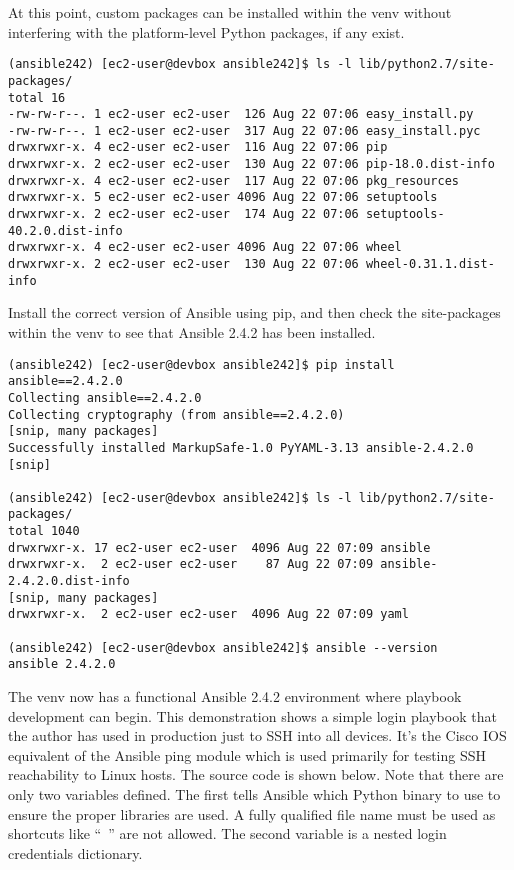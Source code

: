 At this point, custom packages can be installed within the venv without
interfering with the platform-level Python packages, if any exist.

\begin{verbatim}
(ansible242) [ec2-user@devbox ansible242]$ ls -l lib/python2.7/site-packages/
total 16
-rw-rw-r--. 1 ec2-user ec2-user  126 Aug 22 07:06 easy_install.py
-rw-rw-r--. 1 ec2-user ec2-user  317 Aug 22 07:06 easy_install.pyc
drwxrwxr-x. 4 ec2-user ec2-user  116 Aug 22 07:06 pip
drwxrwxr-x. 2 ec2-user ec2-user  130 Aug 22 07:06 pip-18.0.dist-info
drwxrwxr-x. 4 ec2-user ec2-user  117 Aug 22 07:06 pkg_resources
drwxrwxr-x. 5 ec2-user ec2-user 4096 Aug 22 07:06 setuptools
drwxrwxr-x. 2 ec2-user ec2-user  174 Aug 22 07:06 setuptools-40.2.0.dist-info
drwxrwxr-x. 4 ec2-user ec2-user 4096 Aug 22 07:06 wheel
drwxrwxr-x. 2 ec2-user ec2-user  130 Aug 22 07:06 wheel-0.31.1.dist-info
\end{verbatim}

Install the correct version of Ansible using pip, and then check the
site-packages within the venv to see that Ansible 2.4.2 has been installed.

\begin{verbatim}
(ansible242) [ec2-user@devbox ansible242]$ pip install ansible==2.4.2.0
Collecting ansible==2.4.2.0
Collecting cryptography (from ansible==2.4.2.0)
[snip, many packages]
Successfully installed MarkupSafe-1.0 PyYAML-3.13 ansible-2.4.2.0 [snip]

(ansible242) [ec2-user@devbox ansible242]$ ls -l lib/python2.7/site-packages/
total 1040
drwxrwxr-x. 17 ec2-user ec2-user  4096 Aug 22 07:09 ansible
drwxrwxr-x.  2 ec2-user ec2-user    87 Aug 22 07:09 ansible-2.4.2.0.dist-info
[snip, many packages]
drwxrwxr-x.  2 ec2-user ec2-user  4096 Aug 22 07:09 yaml

(ansible242) [ec2-user@devbox ansible242]$ ansible --version
ansible 2.4.2.0
\end{verbatim}

The venv now has a functional Ansible 2.4.2 environment where playbook
development can begin. This demonstration shows a simple login playbook that
the author has used in production just to SSH into all devices. It's the Cisco
IOS equivalent of the Ansible ping module which is used primarily for testing
SSH reachability to Linux hosts. The source code is shown below. Note that
there are only two variables defined. The first tells Ansible which Python
binary to use to ensure the proper libraries are used. A fully qualified file
name must be used as shortcuts like ``~'' are not allowed. The second variable
is a nested login credentials dictionary.

